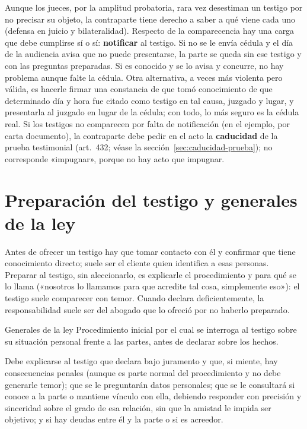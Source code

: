 \documentclass[12pt,oneside]{book}
\begin{document}
Aunque los jueces, por la amplitud probatoria, rara vez desestiman un testigo por no precisar su objeto, la contraparte tiene derecho a saber a qué viene cada uno (defensa en juicio y bilateralidad). Respecto de la comparecencia hay una carga que debe cumplirse sí o sí: \textbf{notificar} al testigo. Si no se le envía cédula y el día de la audiencia avisa que no puede presentarse, la parte se queda sin ese testigo y con las preguntas preparadas. Si es conocido y se lo avisa y concurre, no hay problema aunque falte la cédula. Otra alternativa, a veces más violenta pero válida, es hacerle firmar una constancia de que tomó conocimiento de que determinado día y hora fue citado como testigo en tal causa, juzgado y lugar, y presentarla al juzgado en lugar de la cédula; con todo, lo más seguro es la cédula real. Si los testigos no comparecen por falta de notificación (en el ejemplo, por carta documento), la contraparte debe pedir en el acto la \textbf{caducidad} de la prueba testimonial (art.~432; véase la sección~\ref{sec:caducidad-prueba}); no corresponde «impugnar», porque no hay acto que impugnar.

\section{Preparación del testigo y generales de la ley}

Antes de ofrecer un testigo hay que tomar contacto con él y confirmar que tiene conocimiento directo; suele ser el cliente quien identifica a esas personas. Preparar al testigo, sin aleccionarlo, es explicarle el procedimiento y para qué se lo llama («nosotros lo llamamos para que acredite tal cosa, simplemente eso»): el testigo suele comparecer con temor. Cuando declara deficientemente, la responsabilidad suele ser del abogado que lo ofreció por no haberlo preparado.

\begin{definicion}{Generales de la ley}
Procedimiento inicial por el cual se interroga al testigo sobre su situación personal frente a las partes, antes de declarar sobre los hechos.
\end{definicion}

\begin{importante}
Debe explicarse al testigo que declara bajo juramento y que, si miente, hay consecuencias penales (aunque es parte normal del procedimiento y no debe generarle temor); que se le preguntarán datos personales; que se le consultará si conoce a la parte o mantiene vínculo con ella, debiendo responder con precisión y sinceridad sobre el grado de esa relación, sin que la amistad le impida ser objetivo; y si hay deudas entre él y la parte o si es acreedor.
\end{importante}
\end{document}
